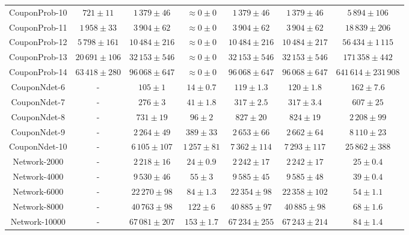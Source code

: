 \begin{table}[H]
\begin{adjustbox}{max width=\textwidth}
\begin{tabu}{c | c | ccc | c | c}
		\midrule
		CouponProb-10 & 
		$721 \pm 11$ &
		$1\,379 \pm 46$ & {$\approx 0 \pm 0$} & {$1\,379 \pm 46$} & 
		{$1\,379 \pm 46$} & $5\,894 \pm 106$ \\
		CouponProb-11 & 
		$1\,958 \pm 33$ & 
		$3\,904 \pm 62$ & {$\approx 0 \pm 0$} & {$3\,904 \pm 62$} & 
		{$3\,904 \pm 62$} & $18\,839 \pm 206$ \\
		CouponProb-12 & 
		$5\,798 \pm 161$ & 
		$10\,484 \pm 216$ & {$\approx 0 \pm 0$} & {$10\,484 \pm 216$} & 
		{$10\,484 \pm 217$} & $56\,434 \pm 1\,115$ \\
		CouponProb-13 & 
		$20\,691 \pm 106$ & 
		$32\,153 \pm 546$ & {$\approx 0 \pm 0$} & {$32\,153 \pm 546$} & 
		{$32\,153 \pm 546$} & $171\,358 \pm 442$ \\
		CouponProb-14 & 
		$63\,418 \pm 280$ & 
		$96\,068 \pm 647$ & {$\approx 0 \pm 0$} & {$96\,068 \pm 647$} & 
		{$96\,068 \pm 647$} & $641\,614 \pm 231\,908$ \\
		
		\midrule
		CouponNdet-6 & 
				- & $105 \pm 1$ &  {$14 \pm 0.7$} & {$119 \pm 1.3$} & {$120 \pm 1.8$} & $162 \pm 7.6$ \\
		CouponNdet-7 & 
				- & $276 \pm 3$ & {$41 \pm 1.8$} & {$317 \pm 2.5$} & {$317 \pm 3.4$} & $607 \pm 25$ \\
		CouponNdet-8 & 
				- & $731 \pm 19$ & {$96 \pm 2$} & {$827 \pm 20$} & {$824 \pm 19$} & $2\,208 \pm 99$ \\
		CouponNdet-9 & 
				- & $2\,264 \pm 49$ & {$389 \pm 33$} & {$2\,653 \pm 66$} & {$2\,662 \pm 64$} & $8\,110 \pm 23$ \\
		CouponNdet-10 & 
				- & $6\,105 \pm 107$ & {$1\,257 \pm 81$} & {$7\,362 \pm 114$} & {$7\,293 \pm 117$} & $25\,862 \pm 388$ \\
		 
		\midrule
		Network-2000 & - & $2\,218 \pm 16$ & {$24 \pm 0.9$} & {$2\,242 \pm 17$} & {$2\,242 \pm 17$} & $25 \pm 0.4$ \\
		Network-4000 & - & $9\,530 \pm 46$ & {$55 \pm 3$} & {$9\,585 \pm 45$} & {$9\,585 \pm 48$} & $39 \pm 0.4$ \\
		Network-6000 & - & $22\,270 \pm 98$ & {$84 \pm 1.3$} & {$22\,354 \pm 98$} &{$22\,358 \pm 102$} & $54 \pm 1.1$ \\
		Network-8000 & - & $40\,763 \pm 98$ & {$122 \pm 6$} & {$40\,885 \pm 97$} & {$40\,885 \pm 98$} & $68 \pm 1.6$ \\
		Network-10000 & - & $67\,081 \pm 207$ & {$153 \pm 1.7$} & {$67\,234 \pm 255$} & {$67\,243 \pm 214$} & $84 \pm 1.4$ \\
		

\end{tabu}
\end{adjustbox}
\end{table}
